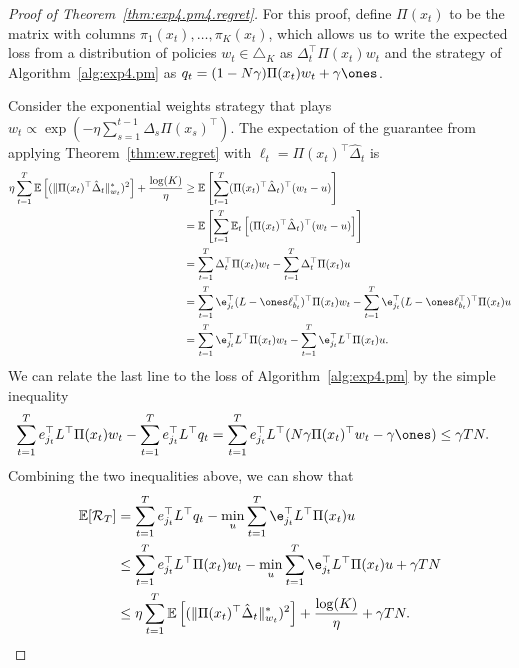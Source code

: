 \documentclass{article}
\begin{document}
\begin{proof}[Proof of Theorem~\ref{thm:exp4.pm4.regret}]
  For this proof, define $\Pi(x_t)$ to be the matrix with columns $\pi_1(x_t),\ldots, \pi_K(x_t)$, which allows us to write the expected loss from a distribution of policies $w_t \in \triangle_K$ as $\Delta_t^\top \Pi(x_t) w_t$ and the strategy of Algorithm~\ref{alg:exp4.pm} as $q_t = (1-N\gamma) \Pi(x_t) w_t + \gamma\ones$. 

  Consider the exponential weights strategy that plays $w_t\propto \exp(- \eta\sum_{s=1}^{t-1}\Delta_s \Pi(x_s)^\top)$. The expectation of the guarantee from applying Theorem~\ref{thm:ew.regret} with $\ell_t = \Pi(x_t)^\top\hat\Delta_t$ is \begin{align*}
  \eta \sum_{t=1}^T \ex\left[(\Vert \Pi(x_t)^\top \hat\Delta_t  \Vert_{w_t}^*)^2\right] + \frac{\log (K)}{\eta}
  &\geq
  \ex\left[\sum_{t=1}^T(\Pi(x_t)^\top\hat\Delta_t)^\top (w_t - u) \right]\\
  &=
    \ex\left[\sum_{t=1}^T\ex_t\left[(\Pi(x_t)^\top\hat\Delta_t)^\top (w_t - u)
     \right]\right]\\
  &=
    \sum_{t=1}^T  \Delta_t^\top \Pi(x_t)w_t
    -\sum_{t=1}^T \Delta_t^\top \Pi(x_t)u\\
  &=
    \sum_{t=1}^T \e_{j_t}^\top (L - \ones\ell_{b_t}^\top)^\top\Pi(x_t) w_t
    -\sum_{t=1}^T \e_{j_t}^\top(L - \ones\ell_{b_t}^\top)^\top\Pi(x_t) u\\
  &=
    \sum_{t=1}^T \e_{j_t}^\top L^\top\Pi(x_t) w_t
    -\sum_{t=1}^T \e_{j_t}^\top L^\top\Pi(x_t) u.
\end{align*}
We can relate the last line to the loss of Algorithm~\ref{alg:exp4.pm} by the simple inequality
\begin{align*}  
  \sum_{t=1}^T e_{j_t}^\top L^\top \Pi(x_t)w_t
  -
  \sum_{t=1}^T e_{j_t}^\top L^\top  q_t
  &=
    \sum_{t=1}^T e_{j_t}^\top L^\top    
    (  N \gamma \Pi(x_t)^\top w_t - \gamma\ones )
    \leq
    \gamma T N.
\end{align*}
Combining the two inequalities above, we can show that
\begin{align}
  \ex[\Regret_T]
  &=
    \sum_{t=1}^T e_{j_t}^\top L^\top  q_t -  \min_u \sum_{t=1}^T \e_{j_t}^\top L^\top\Pi(x_t) u\notag\\
  &\leq
    \sum_{t=1}^T e_{j_t}^\top L^\top  \Pi(x_t) w_t
    - \min_u \sum_{t=1}^T \e_{j_t}^\top L^\top\Pi(x_t) u + \gamma T N\notag\\
    &\leq
      \eta \sum_{t=1}^T \ex\left[(\Vert \Pi(x_t)^\top \hat\Delta_t  \Vert_{w_t}^*)^2\right]
      + \frac{\log (K)}{\eta} + \gamma T N.
      \label{eqn:general.ew.regret}
\end{align}


\end{proof}
\end{document}
